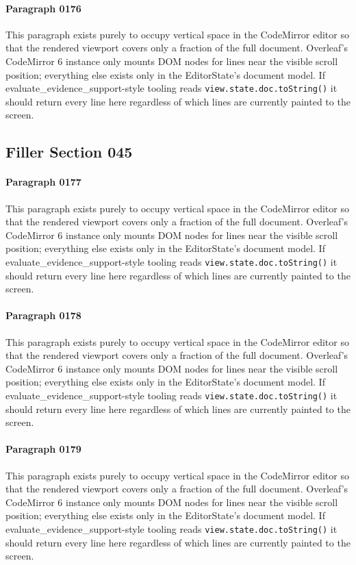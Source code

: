 \documentclass{article}
\begin{document}
\paragraph{Paragraph 0176}
This paragraph exists purely to occupy vertical space in the CodeMirror editor so that the rendered viewport covers only a fraction of the full document. Overleaf's CodeMirror 6 instance only mounts DOM nodes for lines near the visible scroll position; everything else exists only in the EditorState's document model. If evaluate\_evidence\_support-style tooling reads \texttt{view.state.doc.toString()} it should return every line here regardless of which lines are currently painted to the screen.

\subsection{Filler Section 045}
\paragraph{Paragraph 0177}
This paragraph exists purely to occupy vertical space in the CodeMirror editor so that the rendered viewport covers only a fraction of the full document. Overleaf's CodeMirror 6 instance only mounts DOM nodes for lines near the visible scroll position; everything else exists only in the EditorState's document model. If evaluate\_evidence\_support-style tooling reads \texttt{view.state.doc.toString()} it should return every line here regardless of which lines are currently painted to the screen.

\paragraph{Paragraph 0178}
This paragraph exists purely to occupy vertical space in the CodeMirror editor so that the rendered viewport covers only a fraction of the full document. Overleaf's CodeMirror 6 instance only mounts DOM nodes for lines near the visible scroll position; everything else exists only in the EditorState's document model. If evaluate\_evidence\_support-style tooling reads \texttt{view.state.doc.toString()} it should return every line here regardless of which lines are currently painted to the screen.

\paragraph{Paragraph 0179}
This paragraph exists purely to occupy vertical space in the CodeMirror editor so that the rendered viewport covers only a fraction of the full document. Overleaf's CodeMirror 6 instance only mounts DOM nodes for lines near the visible scroll position; everything else exists only in the EditorState's document model. If evaluate\_evidence\_support-style tooling reads \texttt{view.state.doc.toString()} it should return every line here regardless of which lines are currently painted to the screen.
\end{document}
